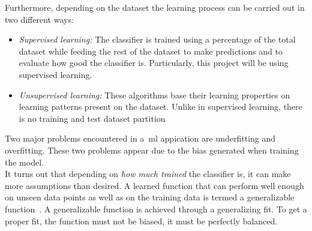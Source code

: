 Furthermore, depending on the dataset the learning process can be carried out in two different ways:
\begin{itemize}
	\item \textit{Supervised learning:} \label{ml:super}The classifier is trained using a percentage of the total dataset while feeding the rest of the dataset to make predictions and to evaluate how good the classifier is. Particularly, this project will be using supervised learning.
	
	\item \textit{Unsupervised learning:} These algorithms base their learning properties on learning patterns present on the dataset. Unlike in supervised learning, there is no training and test dataset partition
\end{itemize}
Two major problems encountered in a~\ac{ml} appication are underfitting and overfitting. These two problems appear due to the bias generated when training the model.\\
It turns out that depending on \textit{how much trained} the classifier is, it can make more assumptions than desired. A learned function that can perform well enough on unseen data points as well as on the training data is termed a generalizable function~\cite{gs}. A generalizable function is achieved through a generalizing fit. To get a proper fit, the function must not be biased, it must be perfectly balanced. 
